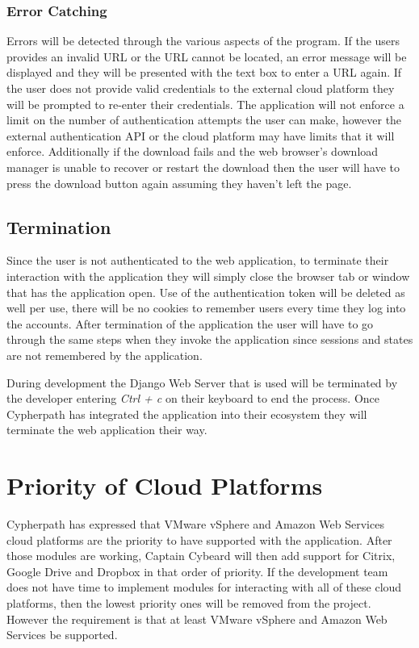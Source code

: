 \documentclass{article}
\begin{document}
            \subsubsection{Error Catching}
            Errors will be detected through the various aspects of the program. If the users provides an invalid URL or the URL cannot be located, an error message will be displayed and they will be presented with
            the text box to enter a URL again. If the user does not provide valid credentials to the external cloud platform they will be prompted to re-enter their credentials.
            The application will not enforce a limit on the number of authentication attempts the user can make, however the external authentication API or the cloud platform may have limits that it will enforce.
            Additionally if the download fails and the web browser's download manager is unable to recover or restart the download then the user will have to press the download button again assuming they haven't left
            the page.

        \subsection{Termination}
        Since the user is not authenticated to the web application, to terminate their interaction with the application they will simply close the browser tab or window that has the
        application open. Use of the authentication token will be deleted as well per use, there will be no cookies to remember users every time they log into the accounts. After termination
        of the application the user will have to go through the same steps when they invoke the application since sessions and states are not remembered by the application.

        During development the Django Web Server that is used will be terminated by the developer entering \textit{Ctrl + c} on their keyboard to end the process. Once Cypherpath has integrated the application into
        their ecosystem they will terminate the web application their way.

    \section{Priority of Cloud Platforms}
    Cypherpath has expressed that VMware vSphere and Amazon Web Services cloud platforms are the priority to have supported with the application. After those modules are working, Captain Cybeard will then add support
    for Citrix, Google Drive and Dropbox in that order of priority. If the development team does not have time to implement modules for interacting with all of these cloud platforms, then the lowest priority ones will be removed
    from the project. However the requirement is that at least VMware vSphere and Amazon Web Services be supported.
\end{document}
